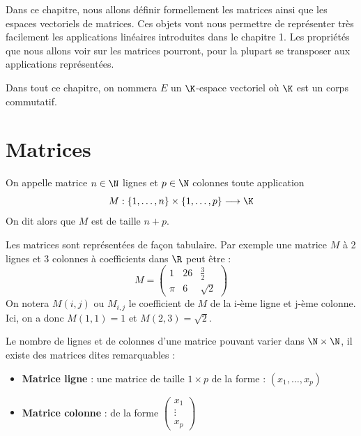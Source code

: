 
\minitoc  %

Dans ce chapitre, nous allons définir formellement les matrices ainsi que les espaces vectoriels de matrices. 
Ces objets vont nous permettre de représenter très facilement les applications linéaires introduites dans le 
chapitre 1. Les propriétés que nous allons voir sur les matrices pourront, pour la plupart se transposer aux applications 
représentées. 

\vspace{0.3cm}

Dans tout ce chapitre, on nommera $E$ un $\K$-espace vectoriel où $\K$ est un corps commutatif. 


\section{Matrices}

\begin{definition}[Matrice]
    On appelle matrice $n \in \N$ lignes et $p \in \N$ colonnes toute application 
        \[ M : \{1, \dots , n\} \times \{1, \dots , p\} \longrightarrow \K \] 
    On dit alors que $M$ est de taille $n + p$. 
\end{definition}

\begin{example}
    Les matrices sont représentées de façon tabulaire. 
    Par exemple une matrice $M$ à 2 lignes et 3 colonnes à coefficients dans $\R$ peut être : 
        \[ M = 
            \begin{pmatrix}
                1 & 26 & \frac{3}{2} \\ 
                \pi & 6 & \sqrt{2} 
            \end{pmatrix} \] 
    On notera $M(i,j)$ ou $M_{i,j}$ le coefficient de $M$ de la i-ème ligne et j-ème colonne. 
    Ici, on a donc $M(1,1) = 1$ et $M(2, 3) = \sqrt{2}$. 
\end{example}

\begin{proposition}
    Le nombre de lignes et de colonnes d'une matrice pouvant varier dans $\N \times \N$, il existe des 
    matrices dites remarquables : 
    \begin{itemize}
        \item \textbf{Matrice ligne} : une matrice de taille $ 1 \times p$ de la forme : $(x_1, \dots, x_p)$ 
        \item \textbf{Matrice colonne} : de la forme 
        $ \begin{pmatrix}
            x_1 \\ 
            \vdots \\ 
            x_p 
        \end{pmatrix}$ 
    \end{itemize} 
\end{proposition}

